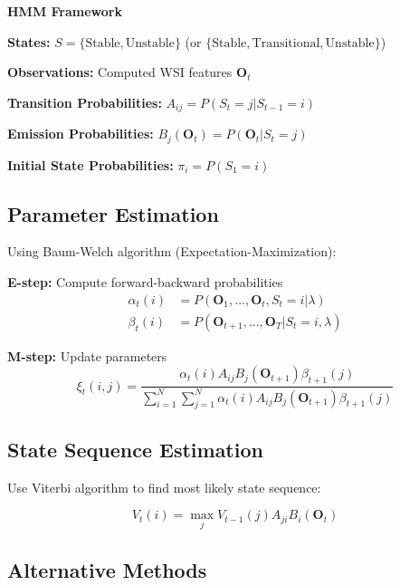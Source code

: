 \documentclass[11pt,a4paper]{article}
\begin{document}
\begin{mathbox}
\textbf{HMM Framework}

\textbf{States:} $S = \{\text{Stable}, \text{Unstable}\}$ (or $\{\text{Stable}, \text{Transitional}, \text{Unstable}\}$)

\textbf{Observations:} Computed WSI features $\mathbf{O}_t$

\textbf{Transition Probabilities:} $A_{ij} = P(S_t = j | S_{t-1} = i)$

\textbf{Emission Probabilities:} $B_j(\mathbf{O}_t) = P(\mathbf{O}_t | S_t = j)$

\textbf{Initial State Probabilities:} $\pi_i = P(S_1 = i)$
\end{mathbox}

\subsection{Parameter Estimation}

Using Baum-Welch algorithm (Expectation-Maximization):

\textbf{E-step:} Compute forward-backward probabilities
\begin{align}
\alpha_t(i) &= P(\mathbf{O}_1, ..., \mathbf{O}_t, S_t = i | \lambda) \\
\beta_t(i) &= P(\mathbf{O}_{t+1}, ..., \mathbf{O}_T | S_t = i, \lambda)
\end{align}

\textbf{M-step:} Update parameters
\begin{equation}
\xi_t(i,j) = \frac{\alpha_t(i) A_{ij} B_j(\mathbf{O}_{t+1}) \beta_{t+1}(j)}{\sum_{i=1}^{N} \sum_{j=1}^{N} \alpha_t(i) A_{ij} B_j(\mathbf{O}_{t+1}) \beta_{t+1}(j)}
\end{equation}

\subsection{State Sequence Estimation}

Use Viterbi algorithm to find most likely state sequence:

\begin{equation}
V_t(i) = \max_{j} V_{t-1}(j) A_{ji} B_i(\mathbf{O}_t)
\end{equation}

\subsection{Alternative Methods}
\end{document}
